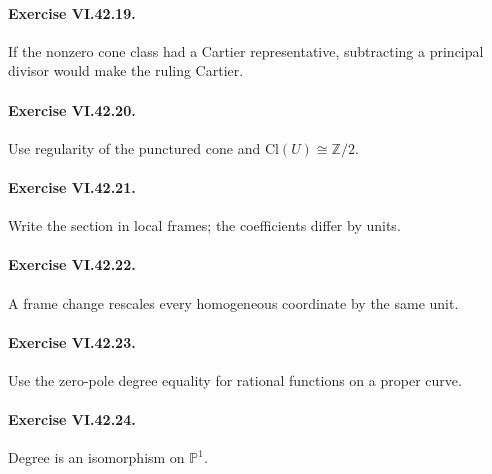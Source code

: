 \paragraph{Exercise VI.42.19.}
\begin{hint}
If the nonzero cone class had a Cartier representative, subtracting a principal divisor would make the ruling Cartier.
\end{hint}

\paragraph{Exercise VI.42.20.}
\begin{hint}
Use regularity of the punctured cone and \(\mathrm{Cl}(U)\cong\mathbb Z/2\).
\end{hint}

\paragraph{Exercise VI.42.21.}
\begin{hint}
Write the section in local frames; the coefficients differ by units.
\end{hint}

\paragraph{Exercise VI.42.22.}
\begin{hint}
A frame change rescales every homogeneous coordinate by the same unit.
\end{hint}

\paragraph{Exercise VI.42.23.}
\begin{hint}
Use the zero-pole degree equality for rational functions on a proper curve.
\end{hint}

\paragraph{Exercise VI.42.24.}
\begin{hint}
Degree is an isomorphism on \(\mathbb P^1\).
\end{hint}
